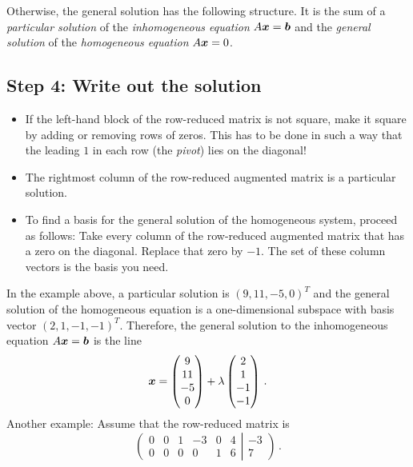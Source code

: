 Otherwise, the general solution has the following structure.  It is
the sum of a \emph{particular solution} of the \emph{inhomogeneous
equation} $A\boldsymbol{x}=\boldsymbol{b}$ and the \emph{general solution} of the
\emph{homogeneous equation} $A\boldsymbol{x}=0$.

\subsection*{Step 4: Write out the solution}

\begin{itemize}
\item If the left-hand block of the row-reduced matrix is not square,
make it square by adding or removing rows of zeros.  This has to
be done in such a way that the leading $1$ in each row (the
\emph{pivot}) lies on the diagonal!
\item The rightmost column of the row-reduced augmented matrix is a
particular solution.
\item To find a basis for the general solution of the homogeneous
system, proceed as follows:  Take every column of the row-reduced
augmented matrix that has a zero on the diagonal.  Replace that zero
by $-1$.  The set of these column vectors is the basis you need.
\end{itemize}
In the example above, a particular solution is $(9, 11, -5, 0)^T$ and
the general solution of the homogeneous equation is a one-dimensional
subspace with basis vector $(2,1,-1,-1)^T$.  Therefore, the general
solution to the inhomogeneous equation $A\boldsymbol{x}=\boldsymbol{b}$ is the line
\begin{equation*}
  \boldsymbol{x} = 
  \begin{pmatrix}
    9 \\ 11 \\ -5 \\ 0
  \end{pmatrix}
  + \lambda
  \begin{pmatrix}
  2 \\ 1 \\ -1 \\ -1
  \end{pmatrix} \,.
\end{equation*}
Another example:  Assume that the row-reduced matrix is
\begin{equation*}
  \left(
  \begin{matrix}
  0 & 0 & 1 & -3 & 0 & 4\\
  0 & 0 & 0 & 0 & 1 & 6 
  \end{matrix}
  \right.\left|\left.
  \begin{matrix}
  -3 \\ 7
  \end{matrix}
  \right)\right.\,.
\end{equation*}
